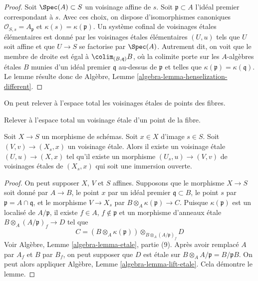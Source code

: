 \begin{proof}
Soit $\Spec(A) \subset S$ un voisinage affine de $s$.
Soit $\mathfrak p \subset A$ l'idéal premier correspondant à $s$.
Avec ces choix, on dispose d'isomorphismes canoniques
$\mathcal{O}_{S, s} = A_{\mathfrak p}$ et $\kappa(s) = \kappa(\mathfrak p)$.
Un système cofinal de voisinages \'etales élémentaires est donné par les
voisinages \'etales élémentaires $(U, u)$ tels que $U$ soit affine et que
$U \to S$ se factorise par $\Spec(A)$. Autrement dit, on voit que
le membre de droite est égal à $\colim_{(B, \mathfrak q)} B$,
où la colimite porte sur les $A$-algèbres \'etales $B$ munies d'un idéal premier
$\mathfrak q$ au-dessus de $\mathfrak p$ et telles que
$\kappa(\mathfrak p) = \kappa(\mathfrak q)$.
Le lemme résulte donc de
Algèbre, Lemme \ref{algebra-lemma-henselization-different}.
\end{proof}

\noindent
On peut relever à l'espace total les voisinages \'etales de points
des fibres.

\begin{lemma}
\label{lemma-lift-etale-neighbourhood-fibre}
\begin{slogan}
Relever à l'espace total un voisinage \'etale d'un point de la fibre.
\end{slogan}
Soit $X \to S$ un morphisme de schémas. Soit $x \in X$ d'image $s \in S$.
Soit $(V, v) \to (X_s, x)$ un voisinage \'etale.
Alors il existe un voisinage \'etale $(U, u) \to (X, x)$
tel qu'il existe un morphisme $(U_s, u) \to (V, v)$
de voisinages \'etales de $(X_s, x)$ qui soit une immersion ouverte.
\end{lemma}

\begin{proof}
On peut supposer $X$, $V$ et $S$ affines. Supposons que le morphisme
$X \to S$ soit donné par $A \to B$, le point $x$ par un idéal premier
$\mathfrak q \subset B$, le point $s$ par $\mathfrak p = A \cap \mathfrak q$,
et le morphisme $V \to X_s$ par $B \otimes_A \kappa(\mathfrak p) \to C$.
Puisque $\kappa(\mathfrak p)$ est un localisé de
$A/\mathfrak p$, il existe $f \in A$, $f \not \in \mathfrak p$
et un morphisme d'anneaux \'etale $B \otimes_A (A/\mathfrak p)_f \to D$
tel que
$$
C = (B \otimes_A \kappa(\mathfrak p))
\otimes_{B \otimes_A (A/\mathfrak p)_f} D
$$
Voir Algèbre, Lemme \ref{algebra-lemma-etale}, partie (9).
Après avoir remplacé $A$ par $A_f$ et $B$ par $B_f$, on peut supposer que
$D$ est \'etale sur $B \otimes_A A/\mathfrak p = B/\mathfrak p B$.
On peut alors appliquer Algèbre, Lemme \ref{algebra-lemma-lift-etale}.
Cela démontre le lemme.
\end{proof}














